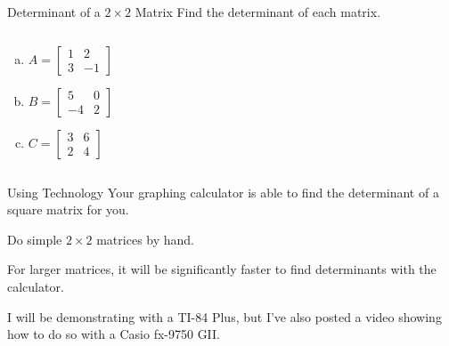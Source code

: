 \documentclass[t]{beamer}
\begin{document}
	\begin{frame}{Determinant of a $2\times 2$ Matrix}
		Find the determinant of each matrix. \vspace{24pt}
		\begin{columns}
			\begin{column}{0.3\textwidth}
				\vspace{-24pt} \begin{enumerate}[a)]
					\item $A = \begin{bmatrix}
					1 & 2 \\ 3 & -1
					\end{bmatrix}$ \vspace{8pt}
					\item $B = \begin{bmatrix}
					5 & 0 \\ -4 & 2
					\end{bmatrix}$ \vspace{8pt}
					\item $C = \begin{bmatrix}
					3 & 6 \\ 2 & 4
					\end{bmatrix}$
				\end{enumerate}
			\end{column}
		\begin{column}{0.7\textwidth}
			  \vspace{12pt}
			
			 \vspace{12pt}
			
		\end{column}			
		\end{columns}
	\end{frame}

	\begin{frame}{Using Technology}
		Your graphing calculator is able to find the determinant of a square matrix for you.
		
		Do simple $2\times 2$ matrices by hand.
		
		For larger matrices, it will be significantly faster to find determinants with the calculator. \pause
		
		I will be demonstrating with a TI-84 Plus, but I've also posted a video showing how to do so with a Casio fx-9750 GII.
	\end{frame}
\end{document}
